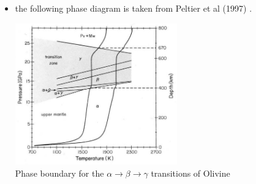 \begin{itemize}
The obvious problem with this otherwise simple approach is that density varies in the domain but 
is not accompanied by a volume change so that it violates mass conservation.

\item the following phase diagram is taken from Peltier et al (1997) \cite{pebs97}.

\begin{center}
\includegraphics[width=7cm]{images/phasetransitions/pebs97}\\
{\captionfont Phase boundary for the $\alpha \rightarrow \beta \rightarrow \gamma$ transitions of 
Olivine}
\end{center}


\end{itemize}


